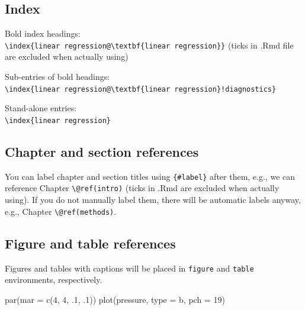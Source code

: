 \documentclass[
]{book}
\newenvironment{Shaded}{\begin{snugshade}}{\end{snugshade}}
\newcommand{\AttributeTok}[1]{\textcolor[rgb]{0.77,0.63,0.00}{#1}}
\newcommand{\DecValTok}[1]{\textcolor[rgb]{0.00,0.00,0.81}{#1}}
\newcommand{\FunctionTok}[1]{\textcolor[rgb]{0.00,0.00,0.00}{#1}}
\newcommand{\NormalTok}[1]{#1}
\newcommand{\StringTok}[1]{\textcolor[rgb]{0.31,0.60,0.02}{#1}}
\begin{document}
\hypertarget{index}{%
\subsection{Index}\label{index}}

Bold index headings:\\
\texttt{\textbackslash{}index\{linear\ regression@\textbackslash{}textbf\{linear\ regression\}\}} (ticks in .Rmd file are excluded when actually using)

Sub-entries of bold headings:\\
\texttt{\textbackslash{}index\{linear\ regression@\textbackslash{}textbf\{linear\ regression\}!diagnostics\}}

Stand-alone entries:\\
\texttt{\textbackslash{}index\{linear\ regression\}}

\hypertarget{chapter-and-section-references}{%
\subsection{Chapter and section references}\label{chapter-and-section-references}}

You can label chapter and section titles using \texttt{\{\#label\}} after them, e.g., we can reference Chapter \texttt{\textbackslash{}@ref(intro)} (ticks in .Rmd are excluded when actually using). If you do not manually label them, there will be automatic labels anyway, e.g., Chapter \texttt{\textbackslash{}@ref(methods)}.

\hypertarget{figure-and-table-references}{%
\subsection{Figure and table references}\label{figure-and-table-references}}

Figures and tables with captions will be placed in \texttt{figure} and \texttt{table} environments, respectively.

\begin{Shaded}
\begin{Highlighting}[]
\FunctionTok{par}\NormalTok{(}\AttributeTok{mar =} \FunctionTok{c}\NormalTok{(}\DecValTok{4}\NormalTok{, }\DecValTok{4}\NormalTok{, .}\DecValTok{1}\NormalTok{, .}\DecValTok{1}\NormalTok{))}
\FunctionTok{plot}\NormalTok{(pressure, }\AttributeTok{type =} \StringTok{\textquotesingle{}b\textquotesingle{}}\NormalTok{, }\AttributeTok{pch =} \DecValTok{19}\NormalTok{)}
\end{Highlighting}
\end{Shaded}
\end{document}
